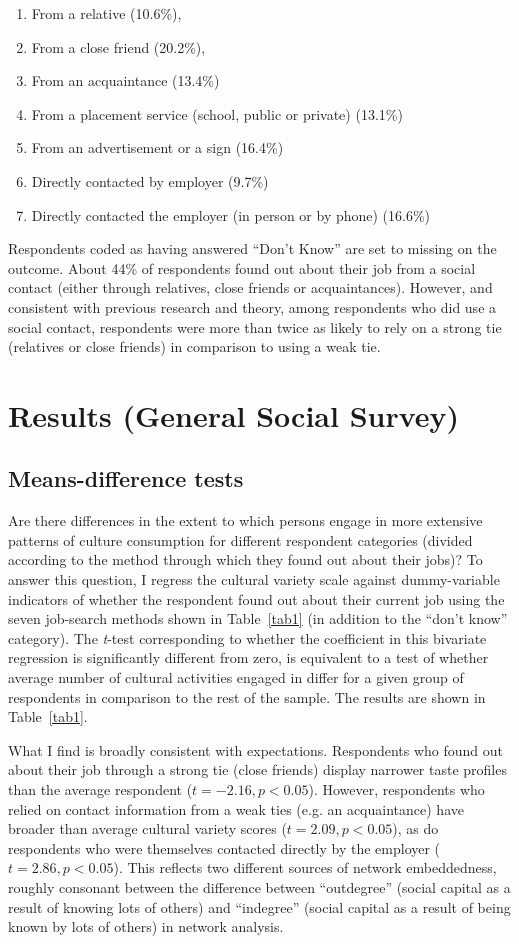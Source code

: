 \documentclass[12pt]{article}
\begin{document}
\begin{enumerate}
	\item From a relative (10.6\%), 
	\item From a close friend (20.2\%),
	\item From an acquaintance (13.4\%)
	\item From a placement service (school, public or private) (13.1\%) 
	\item From an advertisement or a sign (16.4\%) 
	\item Directly contacted by employer (9.7\%) 
	\item Directly contacted the employer (in person or by phone) (16.6\%)
\end{enumerate}

Respondents coded as having answered ``Don't Know'' are set to missing on the outcome. About 44\% of respondents found out about their job from a social contact (either through relatives, close friends or acquaintances). However, and consistent with previous research and theory, among respondents who did use a social contact, respondents were more than twice as likely to rely on a strong tie (relatives or close friends) in comparison to using a weak tie.

\section{Results (General Social Survey)}
\subsection{Means-difference tests}
Are there differences in the extent to which persons engage in more extensive patterns of culture consumption for different respondent categories (divided according to the method through which they found out about their jobs)?  To answer this question, I regress the cultural variety scale against dummy-variable indicators of whether the respondent found out about their current job using the seven job-search methods shown in Table~\ref{tab1} (in addition to the ``don't know'' category).  The \emph{t}-test corresponding to whether the coefficient in this bivariate regression is significantly different from zero, is equivalent to a test of whether average number of cultural activities engaged in differ for a given group of respondents in comparison to the rest of the sample.  The results are shown in Table~\ref{tab1}.

What I find is broadly consistent with expectations.  Respondents who found out about their job through a strong tie (close friends) display narrower taste profiles than the average respondent ($t=-2.16, p<0.05$).  However, respondents who relied on contact information from a weak ties (e.g. an acquaintance) have broader than average cultural variety scores ($t=2.09, p<0.05$), as do respondents who were themselves contacted directly by the employer ($t=2.86, p<0.05$).   This reflects two different sources of network embeddedness, roughly consonant between the difference between ``outdegree'' (social capital as a result of knowing lots of others) and ``indegree'' (social capital as a result of being known by lots of others) in network analysis.  
\end{document}
